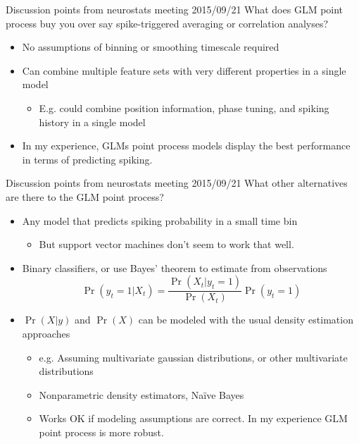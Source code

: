 \documentclass[svgnames,13pt,handout]{beamer}
\begin{document}
\begin{frame}{Discussion points from neurostats meeting 2015/09/21}
What does GLM point process buy you over say spike-triggered averaging or correlation analyses?
\begin{itemize}
	\item No assumptions of binning or smoothing timescale required
	\item Can combine multiple feature sets with very different properties in a single model
	\begin{itemize}
		\item E.g. could combine position information, phase tuning, and spiking history in a single model
		\end{itemize}
	\item In my experience, GLMs point process models display the best performance in terms of predicting spiking.
\end{itemize}
\end{frame} 

\begin{frame}{Discussion points from neurostats meeting 2015/09/21}
What other alternatives are there to the GLM point process?
\begin{itemize}
	\item Any model that predicts spiking probability in a small time bin
	\begin{itemize}
		\item But support vector machines don't seem to work that well. 
		\end{itemize}
	\item Binary classifiers, or use Bayes' theorem to estimate from observations \[\Pr(y_t=1 | X_t) = \frac{\Pr(X_t|y_t=1)}{\Pr(X_t)}{\Pr(y_t=1)}\]
	\item $\Pr(X|y)$ and $\Pr(X)$ can be modeled with the usual density estimation approaches
	\begin{itemize}
		\item e.g. Assuming multivariate gaussian distributions, or other multivariate distributions
		\item Nonparametric density estimators, Naïve Bayes
		\item Works OK if modeling assumptions are correct. In my experience GLM point process is more robust. 
	\end{itemize}
\end{itemize}
\end{frame} 
\end{document}
